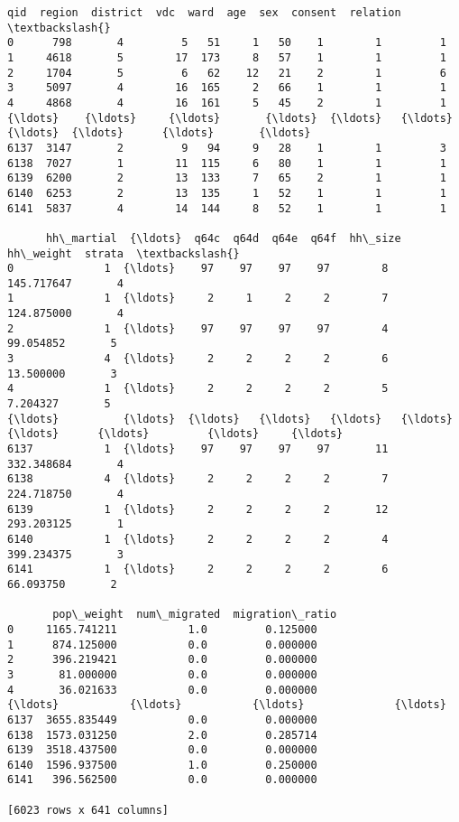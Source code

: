 \documentclass[11pt]{article}
\makeatletter
\newcommand{\boxspacing}{\kern\kvtcb@left@rule\kern\kvtcb@boxsep}
\newcommand{\prompt}[4]{
        {\ttfamily\llap{{\color{#2}[#3]:\hspace{3pt}#4}}\vspace{-\baselineskip}}
    }
\makeatother
\begin{document}
            \begin{tcolorbox}[breakable, size=fbox, boxrule=.5pt, pad at break*=1mm, opacityfill=0]
\prompt{Out}{outcolor}{10}{\boxspacing}
\begin{Verbatim}[commandchars=\\\{\}]
       qid  region  district  vdc  ward  age  sex  consent  relation  \textbackslash{}
0      798       4         5   51     1   50    1        1         1
1     4618       5        17  173     8   57    1        1         1
2     1704       5         6   62    12   21    2        1         6
3     5097       4        16  165     2   66    1        1         1
4     4868       4        16  161     5   45    2        1         1
{\ldots}    {\ldots}     {\ldots}       {\ldots}  {\ldots}   {\ldots}  {\ldots}  {\ldots}      {\ldots}       {\ldots}
6137  3147       2         9   94     9   28    1        1         3
6138  7027       1        11  115     6   80    1        1         1
6139  6200       2        13  133     7   65    2        1         1
6140  6253       2        13  135     1   52    1        1         1
6141  5837       4        14  144     8   52    1        1         1

      hh\_martial  {\ldots}  q64c  q64d  q64e  q64f  hh\_size   hh\_weight  strata  \textbackslash{}
0              1  {\ldots}    97    97    97    97        8  145.717647       4
1              1  {\ldots}     2     1     2     2        7  124.875000       4
2              1  {\ldots}    97    97    97    97        4   99.054852       5
3              4  {\ldots}     2     2     2     2        6   13.500000       3
4              1  {\ldots}     2     2     2     2        5    7.204327       5
{\ldots}          {\ldots}  {\ldots}   {\ldots}   {\ldots}   {\ldots}   {\ldots}      {\ldots}         {\ldots}     {\ldots}
6137           1  {\ldots}    97    97    97    97       11  332.348684       4
6138           4  {\ldots}     2     2     2     2        7  224.718750       4
6139           1  {\ldots}     2     2     2     2       12  293.203125       1
6140           1  {\ldots}     2     2     2     2        4  399.234375       3
6141           1  {\ldots}     2     2     2     2        6   66.093750       2

       pop\_weight  num\_migrated  migration\_ratio
0     1165.741211           1.0         0.125000
1      874.125000           0.0         0.000000
2      396.219421           0.0         0.000000
3       81.000000           0.0         0.000000
4       36.021633           0.0         0.000000
{\ldots}           {\ldots}           {\ldots}              {\ldots}
6137  3655.835449           0.0         0.000000
6138  1573.031250           2.0         0.285714
6139  3518.437500           0.0         0.000000
6140  1596.937500           1.0         0.250000
6141   396.562500           0.0         0.000000

[6023 rows x 641 columns]
\end{Verbatim}
\end{tcolorbox}
        
\end{document}
